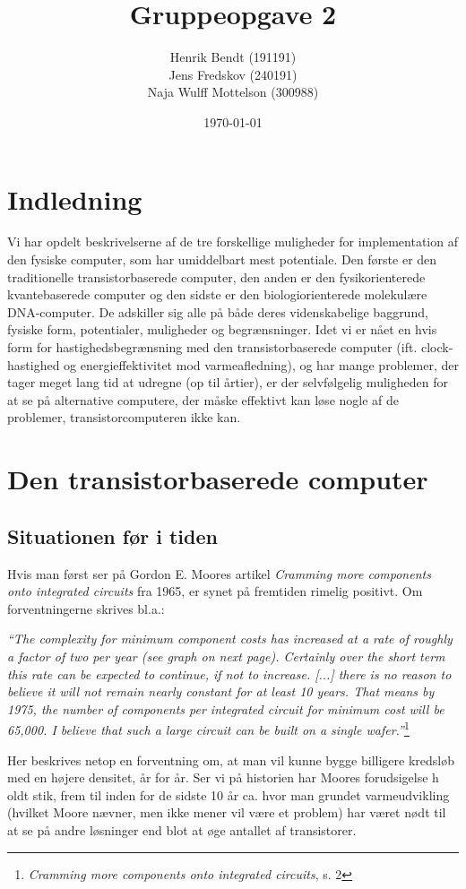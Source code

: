 \documentclass[10pt,a4paper]{article}
\title{Gruppeopgave 2}
\author{Henrik Bendt (191191)\\Jens Fredskov (240191)\\Naja Wulff Mottelson (300988)}
\date{\today}
\newcommand{\citat}[2]{\begin{justify}\textit{``#1''}\hspace{0.1cm}\footnote{#2}\end{justify}}
\begin{document}
\maketitle

\section{Indledning}
Vi har opdelt beskrivelserne af de tre forskellige muligheder for
implementation af den fysiske computer, som har umiddelbart mest potentiale.
Den første er den traditionelle transistorbaserede computer, den anden er den
fysikorienterede kvantebaserede computer og den sidste er den
biologiorienterede molekulære DNA-computer. De adskiller sig alle på både deres
videnskabelige baggrund, fysiske form, potentialer, muligheder og
begrænsninger. Idet vi er nået en hvis form for hastighedsbegrænsning med den
transistorbaserede computer (ift. clock-hastighed og energieffektivitet mod
varmeafledning), og har mange problemer, der tager meget lang tid at udregne (op
til årtier), er der selvfølgelig muligheden for at se på alternative computere,
der måske effektivt kan løse nogle af de problemer, transistorcomputeren ikke
kan.

\section{Den transistorbaserede computer}
\subsection{Situationen før i tiden}
Hvis man først ser på Gordon E. Moores artikel \textit{Cramming more components
onto integrated circuits} fra 1965, er synet på fremtiden rimelig positivt. Om
forventningerne skrives bl.a.: \citat{The complexity for minimum component costs
has increased at a rate of roughly a factor of two per year (see graph on next
page). Certainly over the short term this rate can be expected to continue, if
not to increase. [...] there is no reason to believe it will not remain nearly
constant for at least 10 years. That means by 1975, the number of components per
integrated circuit for minimum cost will be 65,000. I believe that such a large
circuit can be built on a single wafer.}{\textit{Cramming more components onto
integrated circuits}, s. 2}

Her beskrives netop en forventning om, at man vil kunne bygge billigere kredsløb
med en højere densitet, år for år. Ser vi på historien har Moores forudsigelse h
oldt stik, frem til inden for de sidste 10 år ca. hvor man grundet
varmeudvikling (hvilket Moore nævner, men ikke mener vil være et problem) har
været nødt til at se på andre løsninger end blot at øge antallet af
transistorer.
\end{document}
